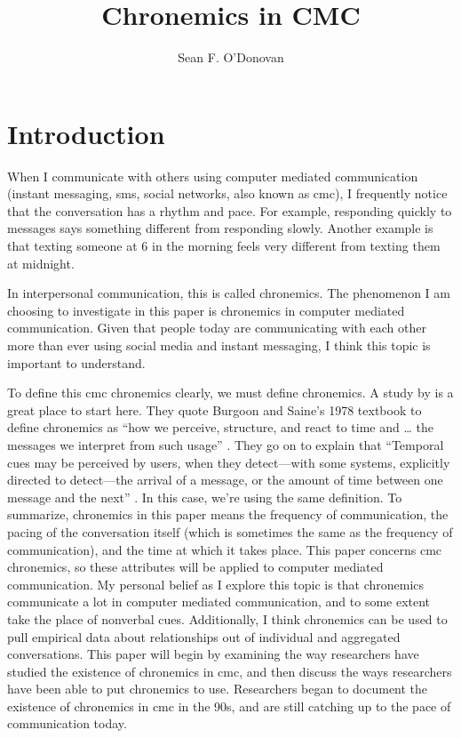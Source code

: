 \documentclass[
  stu]{apa7}
\affiliation{Brian Lamb School of Communication}
\title{Chronemics in CMC}
\author{Sean F. O'Donovan}
\date{}
\begin{document}
\maketitle

\hypertarget{introduction}{%
\section{Introduction}\label{introduction}}

When I communicate with others using computer mediated communication
(instant messaging, sms, social networks, also known as cmc), I
frequently notice that the conversation has a rhythm and pace. For
example, responding quickly to messages says something different from
responding slowly. Another example is that texting someone at 6 in the
morning feels very different from texting them at midnight.

In interpersonal communication, this is called chronemics. The
phenomenon I am choosing to investigate in this paper is chronemics in
computer mediated communication. Given that people today are
communicating with each other more than ever using social media and
instant messaging, I think this topic is important to understand.

To define this cmc chronemics clearly, we must define chronemics. A
study by \textcite{walther95} is a great place to start here. They quote
Burgoon and Saine's 1978 textbook to define chronemics as ``how we
perceive, structure, and react to time and \ldots{} the messages we
interpret from such usage'' \autocite[qtd. as cited in][
356]{walther95}. They go on to explain that ``Temporal cues may be
perceived by users, when they detect---with some systems, explicitly
directed to detect---the arrival of a message, or the amount of time
between one message and the next'' \autocite[ 356]{walther95}. In this
case, we're using the same definition. To summarize, chronemics in this
paper means the frequency of communication, the pacing of the
conversation itself (which is sometimes the same as the frequency of
communication), and the time at which it takes place. This paper
concerns cmc chronemics, so these attributes will be applied to computer
mediated communication. My personal belief as I explore this topic is
that chronemics communicate a lot in computer mediated communication,
and to some extent take the place of nonverbal cues. Additionally, I
think chronemics can be used to pull empirical data about relationships
out of individual and aggregated conversations. This paper will begin by
examining the way researchers have studied the existence of chronemics
in cmc, and then discuss the ways researchers have been able to put
chronemics to use. Researchers began to document the existence of
chronemics in cmc in the 90s, and are still catching up to the pace of
communication today.
\end{document}

